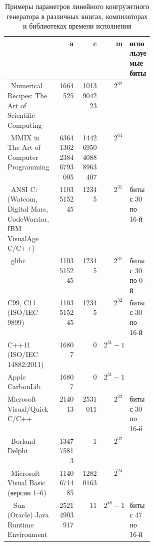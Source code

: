 \begin{landscape}
{\renewcommand{\arraystretch}{1.5}
\begin{table}[h]
\begin{tabular}{|p{0.34\linewidth}|r|r|r|l|}
\hline
									& a		& c		& m		& используемые биты	\\
\hline
\cite{Press:2007}~Numerical Recipes: The Art of Scientific Computing	& 1664525	& 1013904223	& $2^{32}$	& 			\\
\cite{Knuth:2005}~MMIX in The Art of Computer Programming & \tiny{6364136223846793005} & \tiny{1442695040888963407}	& $2^{64}$	&	\\
\hline
\cite{Entacher:1997}~ANSI C:
\tiny{(Watcom, Digital Mars, CodeWarrior, IBM VisualAge C/C++)}		& 1103515245	& 12345		& $2^{31}$	& биты с 30 по 16-й	\\
\cite{Sirca:Horvat:2012}~glibc						& 1103515245	& 12345		& $2^{31}$	& биты с 30 по 0-й	\\
C99, C11 (ISO/IEC 9899) 						& 1103515245	& 12345		& $2^{32}$	& биты с 30 по 16-й	\\
C++11 (ISO/IEC 14882:2011) 						& 16807		& 0		& $2^{31} - 1$	& 			\\
Apple CarbonLib             			                       	& 16807		& 0		& $2^{31} - 1$	& 			\\
Microsoft Visual/Quick C/C++                                    	& 214013	& 2531011	& $2^{32}$	& биты с 30 по 16-й	\\
\hline
\cite{Bucknall:2001}~Borland Delphi					& 134775813	& 1		& $2^{32}$	& \\
\cite{MS-VBRAND:2004}~Microsoft Visual Basic \tiny{(версии 1--6)}	& 1140671485	& 12820163	& $2^{24}$	& 			\\
\cite{Mak:2003}~ Sun (Oracle) Java Runtime Environment			& 25214903917	& 11		& $2^{48} - 1$	& биты с 47 по 16-й	\\
\hline
\end{tabular}
\caption{Примеры параметров линейного конгруэнтного генератора в различных книгах, компиляторах и библиотеках времени исполнения\label{table:lcg}}
\end{table}
}
\end{landscape}
